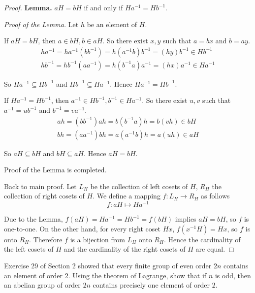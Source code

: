 \begin{proof}
    \textbf{Lemma.} $aH = bH$ if and only if $Ha^{-1} = Hb^{-1}$.

    \textit{Proof of the Lemma.} Let $h$ be an element of $H$.

    If $aH = bH$, then $a\in bH, b\in aH$. So there exist $x, y$ such that $a = bx$ and $b = ay$.
    \[
        \begin{split}
            ha^{-1} = ha^{-1}(bb^{-1}) = h(a^{-1}b)b^{-1} = (hy)b^{-1} \in Hb^{-1} \\
            hb^{-1} = hb^{-1}(aa^{-1}) = h(b^{-1}a)a^{-1} = (hx)a^{-1} \in Ha^{-1}
        \end{split}
    \]

    So $Ha^{-1}\subseteq Hb^{-1}$ and $Hb^{-1}\subseteq Ha^{-1}$. Hence $Ha^{-1} = Hb^{-1}$.

    If $Ha^{-1} = Hb^{-1}$, then $a^{-1}\in Hb^{-1}, b^{-1}\in Ha^{-1}$. So there exist $u, v$ such that $a^{-1} = ub^{-1}$ and $b^{-1} = va^{-1}$.
    \[
        \begin{split}
            ah = (bb^{-1})ah = b(b^{-1}a)h = b(vh) \in bH \\
            bh = (aa^{-1})bh = a(a^{-1}b)h = a(uh) \in aH
        \end{split}
    \]

    So $aH\subseteq bH$ and $bH\subseteq aH$. Hence $aH = bH$.

    Proof of the Lemma is completed.

    Back to main proof. Let $L_{H}$ be the collection of left cosets of $H$, $R_{H}$ the collection of right cosets of $H$. We define a mapping $f: L_{H}\to R_{H}$ as follows
    \[
        f: aH \mapsto Ha^{-1}
    \]

    Due to the Lemma, $f(aH) = Ha^{-1} = Hb^{-1} = f(bH)$ implies $aH = bH$, so $f$ is one-to-one. On the other hand, for every right coset $Hx$, $f(x^{-1}H) = Hx$, so $f$ is onto $R_{H}$. Therefore $f$ is a bijection from $L_{H}$ onto $R_{H}$. Hence the cardinality of the left cosets of $H$ and the cardinality of the right cosets of $H$ are equal.
\end{proof}

\newpage
\begin{exercise}
    Exercise 29 of Section 2 showed that every finite group of even order $2n$ contains an element of order $2$. Using the theorem of Lagrange, show that if $n$ is odd, then an abelian group of order $2n$ contains precisely one element of order $2$.
\end{exercise}

